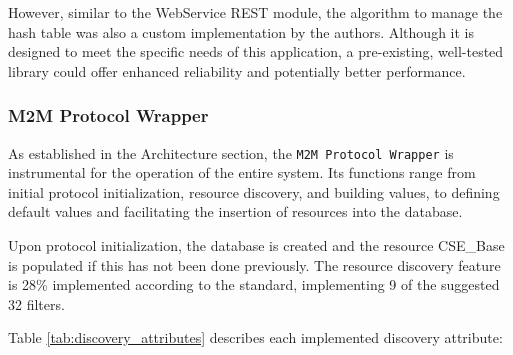 \documentclass[a4paper,fleqn]{cas-dc}
\begin{document}
However, similar to the WebService REST module, the algorithm to manage the hash table was also a custom implementation by the authors. Although it is designed to meet the specific needs of this application, a pre-existing, well-tested library could offer enhanced reliability and potentially better performance.

\subsubsection{M2M Protocol Wrapper}

As established in the Architecture section, the \texttt{M2M Protocol Wrapper} is instrumental for the operation of the entire system. Its functions range from initial protocol initialization, resource discovery, and building values, to defining default values and facilitating the insertion of resources into the database.

Upon protocol initialization, the database is created and the resource CSE\_Base is populated if this has not been done previously. The resource discovery feature is 28\% implemented according to the standard, implementing 9 of the suggested 32 filters.

Table \ref{tab:discovery_attributes} describes each implemented discovery attribute:
\end{document}
